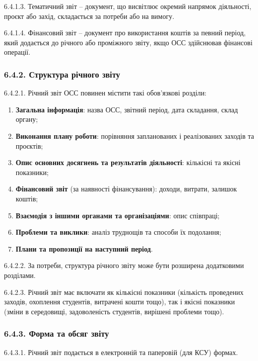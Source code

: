         6.4.1.3. Тематичний звіт -- документ, що висвітлює окремий напрямок діяльності, проєкт або захід, складається за потреби або на вимогу.
        
        6.4.1.4. Фінансовий звіт -- документ про використання коштів за певний період, який додається до річного або проміжного звіту, якщо ОСС здійснював фінансові операції.

    \subsubsection*{6.4.2. Структура річного звіту}
        6.4.2.1. Річний звіт ОСС повинен містити такі обов'язкові розділи:

            \begin{enumerate}[label=\alph*)]
                \item \textbf{Загальна інформація}: назва ОСС, звітний період, дата складання, склад органу;
                \item \textbf{Виконання плану роботи}: порівняння запланованих і реалізованих заходів та проєктів;
                \item \textbf{Опис основних досягнень та результатів діяльності}: кількісні та якісні показники;
                \item \textbf{Фінансовий звіт} (за наявності фінансування): доходи, витрати, залишок коштів;
                \item \textbf{Взаємодія з іншими органами та організаціями}: опис співпраці;
                \item \textbf{Проблеми та виклики}: аналіз труднощів та способи їх подолання;
                \item \textbf{Плани та пропозиції на наступний період}.
            \end{enumerate}
            
        6.4.2.2. За потреби, структура річного звіту може бути розширена додатковими розділами.
        
        6.4.2.3. Річний звіт має включати як кількісні показники (кількість проведених заходів, охоплення студентів, витрачені кошти тощо), так і якісні показники (зміни в середовищі, задоволеність студентів, вирішені проблеми тощо).

    \subsubsection*{6.4.3. Форма та обсяг звіту}
        6.4.3.1. Річний звіт подається в електронній та паперовій (для КСУ) формах.
        
